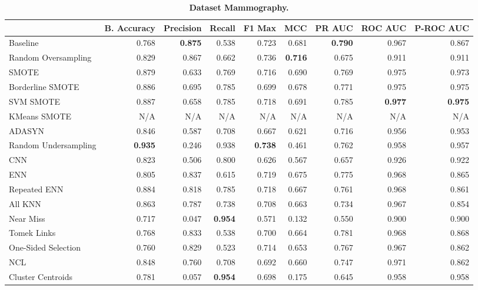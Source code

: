\begin{table}[H]
    \centering
    \setlength\tabcolsep{2pt}
    \begin{tabularx}{\textwidth}{lRRRRRRRR}
        & B. Accuracy & Precision & Recall & F1 Max & MCC & PR AUC & ROC AUC & P-ROC AUC \\
        \midrule
        Baseline & 0.768 & \textbf{0.875} & 0.538 & 0.723 & 0.681 & \textbf{0.790} & 0.967 & 0.867 \\
        Random Oversampling & 0.829 & 0.867 & 0.662 & 0.736 & \textbf{0.716} & 0.675 & 0.911 & 0.911 \\
        SMOTE & 0.879 & 0.633 & 0.769 & 0.716 & 0.690 & 0.769 & 0.975 & 0.973 \\
        Borderline SMOTE & 0.886 & 0.695 & 0.785 & 0.699 & 0.678 & 0.771 & 0.975 & 0.975 \\
        SVM SMOTE & 0.887 & 0.658 & 0.785 & 0.718 & 0.691 & 0.785 & \textbf{0.977} & \textbf{0.975} \\
        KMeans SMOTE & N/A & N/A & N/A & N/A & N/A & N/A & N/A & N/A \\
        ADASYN & 0.846 & 0.587 & 0.708 & 0.667 & 0.621 & 0.716 & 0.956 & 0.953 \\
        Random Undersampling & \textbf{0.935} & 0.246 & 0.938 & \textbf{0.738} & 0.461 & 0.762 & 0.958 & 0.957 \\
        CNN & 0.823 & 0.506 & 0.800 & 0.626 & 0.567 & 0.657 & 0.926 & 0.922 \\
        ENN & 0.805 & 0.837 & 0.615 & 0.719 & 0.675 & 0.775 & 0.968 & 0.865 \\
        Repeated ENN & 0.884 & 0.818 & 0.785 & 0.718 & 0.667 & 0.761 & 0.968 & 0.861 \\
        All KNN & 0.863 & 0.787 & 0.738 & 0.708 & 0.663 & 0.734 & 0.967 & 0.854 \\
        Near Miss & 0.717 & 0.047 & \textbf{0.954} & 0.571 & 0.132 & 0.550 & 0.900 & 0.900 \\
        Tomek Links & 0.768 & 0.833 & 0.538 & 0.700 & 0.664 & 0.781 & 0.968 & 0.868 \\
        One-Sided Selection & 0.760 & 0.829 & 0.523 & 0.714 & 0.653 & 0.767 & 0.967 & 0.862 \\
        NCL & 0.848 & 0.760 & 0.708 & 0.692 & 0.660 & 0.747 & 0.971 & 0.862 \\
        Cluster Centroids & 0.781 & 0.057 & \textbf{0.954} & 0.698 & 0.175 & 0.645 & 0.958 & 0.958 \\
    \end{tabularx}
    \vspace{1mm}
    \caption{\textbf{Dataset Mammography.}}
\end{table}
